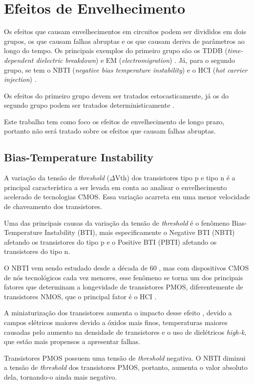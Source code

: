 \section{Efeitos de Envelhecimento}
Os efeitos que causam envelhecimentos em circuitos podem ser divididos em dois grupos, os que causam falhas abruptas e os que causam deriva de parâmetros ao longo do tempo. Os principais exemplos do primeiro grupo são os TDDB (\textit{time-dependent dielectric breakdown}) e EM (\textit{electromigration}) \cite{Lorenz}. Já, para o segundo grupo, se tem o NBTI (\textit{negative bias temperature instability}) e o HCI (\textit{hot carrier injection}) \cite{Lorenz}.

Os efeitos do primeiro grupo devem ser tratados estocasticamente, já os do segundo grupo podem ser tratados deterministicamente \cite{Lorenz}.
       
Este trabalho tem como foco os efeitos de envelhecimento de longo prazo, portanto não será tratado sobre os efeitos que causam falhas abruptas.

\subsection{Bias-Temperature Instability}
\label{sec:BiasTemperatureInstability}

A variação da tensão de \textit{threshold} ($\Delta$Vth) dos transistores tipo p e tipo n é a principal característica a ser levada em conta ao analisar o envelhecimento acelerado de tecnologias CMOS. Essa variação acarreta em uma menor velocidade de chaveamento dos transistores.

Uma das principais causas da variação da tensão de \textit{threshold} é o fenômeno Bias-Temperature Instability (BTI), mais especificamente o Negative BTI (NBTI) afetando os transistores do tipo p e o Positive BTI (PBTI) afetando os transistores do tipo n.

O NBTI vem sendo estudado desde a década de 60 \cite{Alam}, mas com dispositivos CMOS de nós tecnológicos cada vez menores, esse fenômeno se torna um dos principais fatores que determinam a longevidade de transistores PMOS, diferentemente de transistores NMOS, que o principal fator é o HCI \cite{Bhardwaj}.

A miniaturização dos transistores aumenta o impacto desse efeito \cite{Banaszeski}, devido a campos elétricos maiores devido a óxidos mais finos, temperaturas maiores causadas pelo aumento na densidade de transistores e o uso de dielétricos \textit{high-k}, que estão mais propensos a apresentar falhas.

Transistores PMOS possuem uma tensão de \textit{threshold} negativa. O NBTI diminui a tensão de \textit{threshold} dos transistores PMOS, portanto, aumenta o valor absoluto dela, tornando-o ainda mais negativo.




% 
